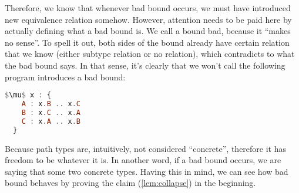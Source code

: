 \documentclass{article}
\theoremstyle{definition}
\begin{document}
Therefore, we know that whenever bad bound occurs, we must have introduced new
equivalence relation somehow. However, attention needs to be paid here by actually
defining what a bad bound is. We call a bound bad, because it ``makes no sense''. To
spell it out, both sides of the bound already have certain relation that we know
(either subtype relation or no relation), which contradicts to what the bad bound
says. In that sense, it's clearly that we won't call the following program introduces
a bad bound:

\nolinenumbers
\begin{lstlisting}[language=Haskell, mathescape=true]
  $\mu$ x : {
    A : x.B .. x.C
    B : x.C .. x.A
    C : x.A .. x.B
  }
\end{lstlisting}
\linenumbers

Because path types are, intuitively, not considered ``concrete'', therefore it has
freedom to be whatever it is. In another word, if a bad bound occurs, we are saying
that some two concrete types. Having this in mind, we can see how bad bound behaves by
proving the claim (\cref{lem:collapse}) in the beginning.
\end{document}
